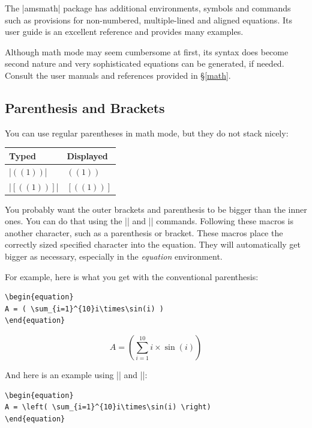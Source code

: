 The |amsmath| package has additional environments, symbols and commands such as
provisions for non-numbered, multiple-lined and aligned equations. Its user
guide is an excellent reference and provides many examples.

Although math mode may seem cumbersome at first, its syntax does become second
nature and very sophisticated equations can be generated, if needed.  Consult
the user manuals and references provided in \S\ref{math}.

\subsection{Parenthesis and Brackets}
You can use regular parentheses in math mode, but they do not stack nicely:

\begin{center}
\begin{tabular}{l|l}
Typed                   & Displayed\\\hline
|$((1))$| & $((1))$\\
|$[((1))]$| & $[((1))]$
\end{tabular}
\end{center}


You probably want the outer brackets and parenthesis to be bigger than the
inner ones. You can do that using the |\left| and |\right| commands.  Following
these macros is another character, such as a parenthesis or bracket.  These
macros place the correctly sized specified character into the equation.  They
will automatically get bigger as necessary, especially in the \emph{equation}
environment.

For example, here is what you get with the conventional parenthesis:
\begin{Verbatim}
\begin{equation}
A = ( \sum_{i=1}^{10}i\times\sin(i) )
\end{equation}
\end{Verbatim}

\begin{equation}
A = ( \sum_{i=1}^{10}i\times\sin(i) )
\end{equation}

And here is an example using |\left| and |\right|:

\begin{Verbatim}
\begin{equation}
A = \left( \sum_{i=1}^{10}i\times\sin(i) \right)
\end{equation}
\end{Verbatim}

